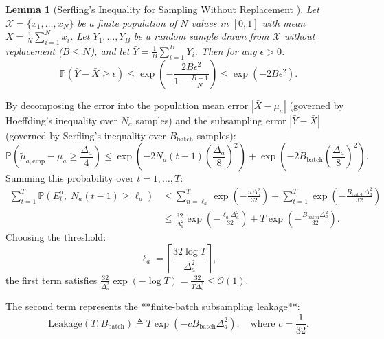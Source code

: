 \documentclass[twoside]{article}
\newtheorem{lemma}[theorem]{Lemma}
\begin{document}
\begin{lemma}[Serfling's Inequality for Sampling Without Replacement \citep{serfling1974probability}]
Let $\mathcal{X} = \{x_1, \dots, x_N\}$ be a finite population of $N$ values in $[0, 1]$ with mean $\bar{X} = \frac{1}{N}\sum_{i=1}^N x_i$. Let $Y_1, \dots, Y_B$ be a random sample drawn from $\mathcal{X}$ without replacement ($B \le N$), and let $\bar{Y} = \frac{1}{B}\sum_{i=1}^B Y_i$. Then for any $\epsilon > 0$:
\begin{equation}
\mathbb{P}\left( \bar{Y} - \bar{X} \ge \epsilon \right) \le \exp\left( - \frac{2 B \epsilon^2}{1 - \frac{B - 1}{N}} \right) \le \exp\left( - 2 B \epsilon^2 \right).
\end{equation}
\end{lemma}
By decomposing the error into the population mean error $|\bar{X} - \mu_a|$ (governed by Hoeffding's inequality over $N_a$ samples) and the subsampling error $|\bar{Y} - \bar{X}|$ (governed by Serfling's inequality over $B_{\text{batch}}$ samples):
\begin{equation}
\mathbb{P}\left( \tilde{\mu}_{a, \text{emp}} - \mu_a \ge \frac{\Delta_a}{4} \right) \le \exp\left( - 2 N_a(t-1) \left(\frac{\Delta_a}{8}\right)^2 \right) + \exp\left( - 2 B_{\text{batch}} \left(\frac{\Delta_a}{8}\right)^2 \right).
\end{equation}
Summing this probability over $t = 1, \dots, T$:
\begin{align}
\sum_{t=1}^T \mathbb{P}\left( E_t^a, \; N_a(t-1) \ge \ell_a \right) &\le \sum_{n=\ell_a}^T \exp\left( - \frac{n \Delta_a^2}{32} \right) + \sum_{t=1}^T \exp\left( - \frac{B_{\text{batch}} \Delta_a^2}{32} \right) \nonumber \\
&\le \frac{32}{\Delta_a^2} \exp\left( - \frac{\ell_a \Delta_a^2}{32} \right) + T \exp\left( - \frac{B_{\text{batch}} \Delta_a^2}{32} \right).
\end{align}
Choosing the threshold:
\begin{equation}
\ell_a = \left\lceil \frac{32 \log T}{\Delta_a^2} \right\rceil,
\end{equation}
the first term satisfies $\frac{32}{\Delta_a^2} \exp(-\log T) = \frac{32}{T \Delta_a^2} \le \mathcal{O}(1)$.

The second term represents the **finite-batch subsampling leakage**:
\begin{equation}
\text{Leakage}(T, B_{\text{batch}}) \triangleq T \exp\left( - c B_{\text{batch}} \Delta_a^2 \right), \quad \text{where } c = \frac{1}{32}.
\end{equation}
\end{document}
